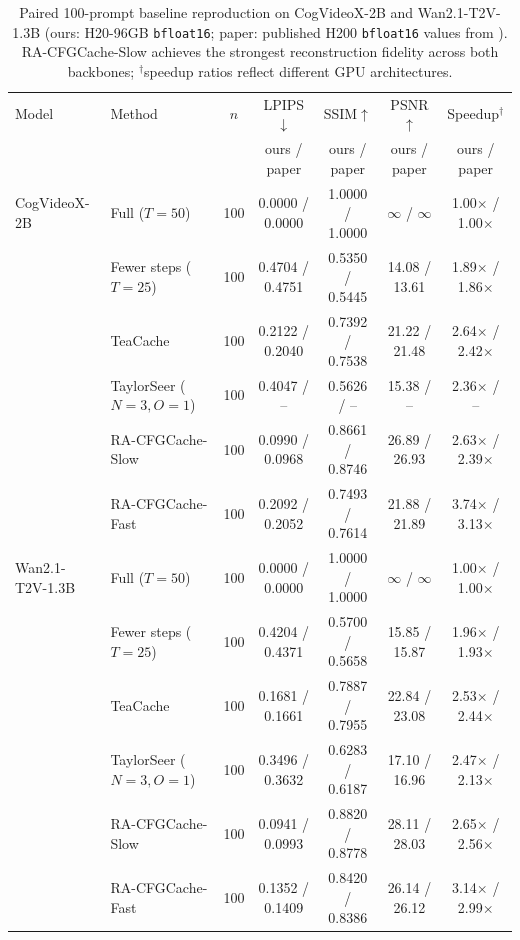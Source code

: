 \begin{table}[t]
\centering
\small
\setlength{\tabcolsep}{4.2pt}
\caption{Paired 100-prompt baseline reproduction on CogVideoX-2B and Wan2.1-T2V-1.3B (ours: H20-96GB \texttt{bfloat16}; paper: published H200 \texttt{bfloat16} values from \citet{liu2026racfgcache}). RA-CFGCache-Slow achieves the strongest reconstruction fidelity across both backbones; $^\dagger$speedup ratios reflect different GPU architectures.}
\label{tab:baselines}
\begin{tabular}{llccccc}
\toprule
Model & Method & $n$ & LPIPS$\downarrow$ & SSIM$\uparrow$ & PSNR$\uparrow$ & Speedup$^\dagger$ \\
 & & & ours / paper & ours / paper & ours / paper & ours / paper \\
\midrule
CogVideoX-2B & Full ($T{=}50$) & 100 & 0.0000 / 0.0000 & 1.0000 / 1.0000 & $\infty$ / $\infty$ & 1.00$\times$ / 1.00$\times$ \\
 & Fewer steps ($T{=}25$) & 100 & 0.4704 / 0.4751 & 0.5350 / 0.5445 & 14.08 / 13.61 & 1.89$\times$ / 1.86$\times$ \\
 & TeaCache & 100 & 0.2122 / 0.2040 & 0.7392 / 0.7538 & 21.22 / 21.48 & 2.64$\times$ / 2.42$\times$ \\
 & TaylorSeer ($N{=}3,O{=}1$) & 100 & 0.4047 / -- & 0.5626 / -- & 15.38 / -- & 2.36$\times$ / -- \\
 & RA-CFGCache-Slow & 100 & 0.0990 / 0.0968 & 0.8661 / 0.8746 & 26.89 / 26.93 & 2.63$\times$ / 2.39$\times$ \\
 & RA-CFGCache-Fast & 100 & 0.2092 / 0.2052 & 0.7493 / 0.7614 & 21.88 / 21.89 & 3.74$\times$ / 3.13$\times$ \\
\midrule
Wan2.1-T2V-1.3B & Full ($T{=}50$) & 100 & 0.0000 / 0.0000 & 1.0000 / 1.0000 & $\infty$ / $\infty$ & 1.00$\times$ / 1.00$\times$ \\
 & Fewer steps ($T{=}25$) & 100 & 0.4204 / 0.4371 & 0.5700 / 0.5658 & 15.85 / 15.87 & 1.96$\times$ / 1.93$\times$ \\
 & TeaCache & 100 & 0.1681 / 0.1661 & 0.7887 / 0.7955 & 22.84 / 23.08 & 2.53$\times$ / 2.44$\times$ \\
 & TaylorSeer ($N{=}3,O{=}1$) & 100 & 0.3496 / 0.3632 & 0.6283 / 0.6187 & 17.10 / 16.96 & 2.47$\times$ / 2.13$\times$ \\
 & RA-CFGCache-Slow & 100 & 0.0941 / 0.0993 & 0.8820 / 0.8778 & 28.11 / 28.03 & 2.65$\times$ / 2.56$\times$ \\
 & RA-CFGCache-Fast & 100 & 0.1352 / 0.1409 & 0.8420 / 0.8386 & 26.14 / 26.12 & 3.14$\times$ / 2.99$\times$ \\
\bottomrule
\end{tabular}
\end{table}
